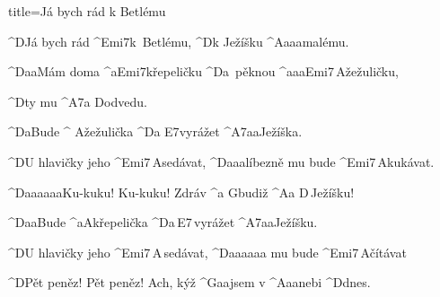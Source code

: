 \begin{song}{title=\predtitle\centering Já bych rád k Betlému \\\large   \vspace*{-0.3cm}}  %
\begin{centerjustified}
\nejnejvetsi

\sloka 
	^{D}Já bych rád ^{Emi7\z }k~Betlému, ^{D}k Ježíšku ^{A{\color{white}aaa}}malému.

	^{D{\color{white}aa}}Mám doma ^{{\color{white}a}Emi7}křepeličku ^{D\z}a~pěknou ^{{\color{white}aaa}Emi7\,A}žežuličku,

	^{D}ty mu ^{A7{\color{white}a\,\,}D}odvedu.

\sloka
	^{D{\color{white}a}}Bude ^{\,\,A}žežulička ^{D{\color{white}a}\,\,E7}vyrážet ^{A7{\color{white}aa}}Ježíška. 

	^{D}U hlavičky jeho ^{Emi7\,A}sedávat, ^{D{\color{white}aaa}}líbezně mu bude ^{Emi7\,A}kukávat.

	^{D{\color{white}aaaaaa}}Ku-kuku! Ku-kuku! Zdráv ^{{\color{white}a}\,\,G}budiž ^{A{\color{white}a\,}\,D\,}Ježíšku!

\sloka
	^{D{\color{white}aa}}Bude ^{{\color{white}a}A}křepelička ^{D{\color{white}a}\,E7\,}vyrážet ^{A7{\color{white}aa}}Ježíšku. 

	^{D}U hlavičky jeho ^{Emi7\,A\,}sedávat, ^{D{\color{white}aaaaaa}} mu bude ^{Emi7\,A}čítávat

	^{D}Pět peněz! Pět peněz! Ach, kýž ^{G{\color{white}aa}}jsem v ^{A{\color{white}aa}}nebi ^{D}dnes.



\end{centerjustified}
\setcounter{Slokočet}{0}
\end{song}

